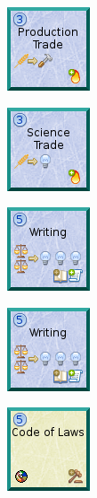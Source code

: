 \documentclass{article}
\begin{document}
\begin{figure}
  \begin{subfigure}{}
    \includegraphics[scale=1]{../rules/png/doe_tech_production_trade.png}
  \end{subfigure}
  \begin{subfigure}{}
    \includegraphics[scale=1]{../rules/png/doe_tech_science_trade.png}
  \end{subfigure}
  \begin{subfigure}{}
    \includegraphics[scale=1]{../rules/png/doe_tech_writing.png}
  \end{subfigure}
  \begin{subfigure}{}
    \includegraphics[scale=1]{../rules/png/doe_tech_writing.png}
  \end{subfigure}
  \begin{subfigure}{}
    \includegraphics[scale=1]{../rules/png/doe_tech_code_of_laws.png}
  \end{subfigure}
\end{figure}
\end{document}
